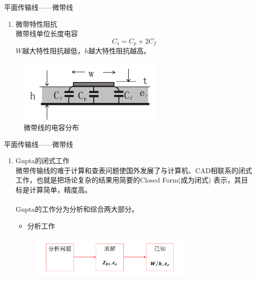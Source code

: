 \begin{frame}{平面传输线——微带线}
    \begin{enumerate}
        \resume
        \item 微带特性阻抗\\
        微带线单位长度电容
        $$C_1=C_p+2C_f$$
        $W$越大特性阻抗越低，$h$越大特性阻抗越高。
        \saveenum
    \end{enumerate}
    \begin{figure}
        \includegraphics[width=7cm]{Cha6//fig6-43.png}
        \caption{微带线的电容分布}
    \end{figure}
\end{frame}

\begin{frame}{平面传输线——微带线}
    \begin{enumerate}
        \resume
        \item Gupta的闭式工作\\
              微带传输线的难于计算和查表问题使国外发展了与计算机、CAD相联系的闭式工作，也就是把场论复杂的结果用简要的Closed Form(成为闭式)
              表示，其目标是计算简单，精度高。\\
              \hspace*{\fill}\\
              Gupta的工作分为分析和综合两大部分。
              \begin{itemize}
                  \item 分析工作
              \end{itemize}
              \begin{figure}
                  \includegraphics[width=8cm]{Cha6//fig6-44.pdf}
              \end{figure}
    \end{enumerate}
\end{frame}

